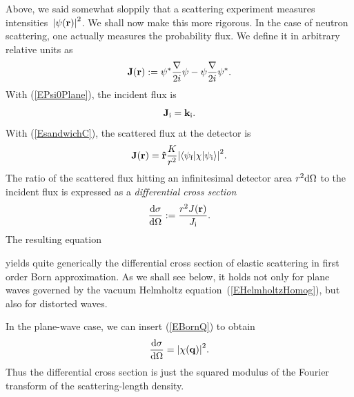 Above, we said somewhat sloppily
that a scattering experiment measures intensities~${|\psi(\mathbf{r})|}^2$.
We shall now make this more rigorous.
In the case of neutron scattering,
one actually measures the probability flux.
We define it in arbitrary relative units as
\begin{equation}\label{EdefJ}
  \mathbf{J}(\mathbf{r}) := \psi^*\frac{\mathbf{\nabla}}{2i}\psi - \psi\frac{\mathbf{\nabla}}{2i}\psi^*.
\end{equation}
%
With (\ref{EPsi0Plane}), the incident flux is
\begin{equation}
  \mathbf{J}_{\text{i}} = \mathbf{k}_{\text{i}}.
\end{equation}
With (\ref{EsandwichC}), the scattered flux at the detector is
\begin{equation}\label{EJr}
  \mathbf{J}(\mathbf{r})
  = \mathbf{\hat r}\frac{K}{r^2}
    {\left|\left\langle\psi_{\text{f}}|\chi|\psi_{\text{i}}\right\rangle\right|}^2.
\end{equation}
The ratio of the scattered flux hitting an infinitesimal detector area
$r^2\text{d}\Omega$ to the incident flux is expressed as a
\textit{differential cross section}
%
\begin{equation}
  \frac{\text{d}\sigma}{\text{d}\Omega}
  := \frac{r^2 J(\mathbf{r})}{J_{\text{i}}}.
\end{equation}
%
%
The resulting equation

yields quite generically the differential cross section of elastic scattering
in first order Born approximation.
As we shall see below,
it holds not only for plane waves governed
by the vacuum Helmholtz equation~(\ref{EHelmholtzHomog}),
but also for distorted waves.

In the plane-wave case, we can insert (\ref{EBornQ}) to obtain
\begin{equation}\label{Ecross1}
  \frac{\text{d}\sigma}{\text{d}\Omega}
  = {\left| \chi(\mathbf{q}) \right|}^2.
\end{equation}
Thus the differential cross section is just the squared modulus
of the Fourier transform 
%
of the scattering-length density.


